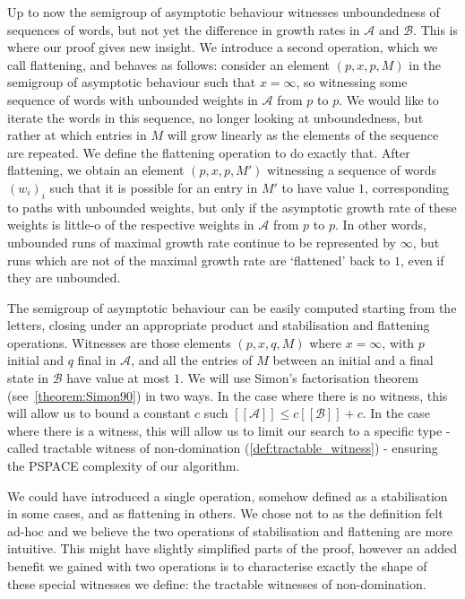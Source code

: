 \documentclass{lmcs}
\theoremstyle{remark}
\newcommand{\autA}{\mathcal{A}}
\newcommand{\autB}{\mathcal{B}}
\newcommand{\brfunc}[1]{[\![#1]\!]}
\newcommand{\funcA}{\brfunc{\autA}}
\newcommand{\funcB}{\brfunc{\autB}}
\theoremstyle{remark}
\begin{document}
Up to now the semigroup of asymptotic behaviour witnesses unboundedness of sequences of words, but not yet the difference in growth rates in $\autA$ and $\autB$. This is where our proof gives new insight. We introduce a second operation, which we call flattening, and behaves as follows: consider an element $(p,x,p,M)$ in the semigroup of asymptotic behaviour such that $x=\infty$, so witnessing some sequence of words with unbounded weights in $\autA$ from $p$ to $p$. We would like to iterate the words in this sequence, no longer looking at unboundedness, but rather at which entries in $M$ will grow linearly as the elements of the sequence are repeated. We define the flattening operation to do exactly that. After flattening, we obtain an element $(p,x,p,M')$ witnessing a sequence of words $(w_i)_i$ such that it is possible for an entry in $M'$ to have value $1$, corresponding to paths with unbounded weights, but only if the asymptotic growth rate of these weights is little-o of the respective weights in $\autA$ from $p$ to $p$. In other words, unbounded runs of maximal growth rate continue to be represented by $\infty$, but runs which are not of the maximal growth rate are `flattened' back to $1$, even if they are unbounded. 

The semigroup of asymptotic behaviour can be easily computed starting from the letters, closing under an appropriate product and stabilisation and flattening operations. Witnesses are those elements $(p,x,q,M)$ where $x = \infty$, with $p$ initial and $q$ final in $\autA$, and all the entries of $M$ between an initial and a final state in $\autB$ have value at most $1$. We will use Simon's factorisation theorem~\cite{Simon90} (see~\cref{theorem:Simon90}) in two ways. In the case where there is no witness, this will allow us to bound a constant $c$ such $\funcA \le c\funcB + c$. In the case where there is a witness, this will allow us to limit our search to a specific type - called tractable witness of non-domination (\cref{def:tractable_witness}) - ensuring the PSPACE complexity of our algorithm.

\begin{rem}
We could have introduced a single operation, somehow defined as a stabilisation in some cases, and as flattening in others. We chose not to as the definition felt ad-hoc and we believe the two operations of stabilisation and flattening are more intuitive. This might have slightly simplified parts of the proof, however an added benefit we gained with two operations is to characterise exactly the shape of these special witnesses we define: the tractable witnesses of non-domination.
\end{rem}
\pagebreak[5]
\end{document}

